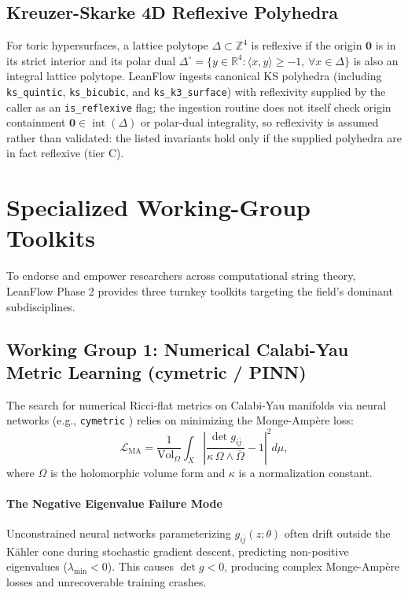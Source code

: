 \documentclass[11pt,a4paper]{article}
\begin{document}
\subsection{Kreuzer-Skarke 4D Reflexive Polyhedra}
For toric hypersurfaces, a lattice polytope $\Delta \subset \mathbb{Z}^4$ is reflexive if the origin $\mathbf{0}$ is in its strict interior and its polar dual $\Delta^\circ = \{ y \in \mathbb{R}^4 : \langle x, y \rangle \ge -1, \, \forall x \in \Delta \}$ is also an integral lattice polytope. LeanFlow ingests canonical KS polyhedra (including \texttt{ks\_quintic}, \texttt{ks\_bicubic}, and \texttt{ks\_k3\_surface}) with reflexivity supplied by the caller as an \texttt{is\_reflexive} flag; the ingestion routine does not itself check origin containment $\mathbf{0} \in \operatorname{int}(\Delta)$ or polar-dual integrality, so reflexivity is assumed rather than validated: the listed invariants hold only if the supplied polyhedra are in fact reflexive (tier C).

\section{Specialized Working-Group Toolkits}
\label{sec:working_groups}

To endorse and empower researchers across computational string theory, LeanFlow Phase 2 provides three turnkey toolkits targeting the field's dominant subdisciplines.

\subsection{Working Group 1: Numerical Calabi-Yau Metric Learning (cymetric / PINN)}
The search for numerical Ricci-flat metrics on Calabi-Yau manifolds via neural networks (e.g., \texttt{cymetric} \cite{anderson2021cymetric}) relies on minimizing the Monge-Ampère loss:
\begin{equation}
\mathcal{L}_{\text{MA}} = \frac{1}{\text{Vol}_\Omega} \int_X \left| \frac{\det g_{i\bar{j}}}{\kappa \, \Omega \wedge \bar{\Omega}} - 1 \right|^2 d\mu,
\end{equation}
where $\Omega$ is the holomorphic volume form and $\kappa$ is a normalization constant.

\paragraph{The Negative Eigenvalue Failure Mode}
Unconstrained neural networks parameterizing $g_{i\bar{j}}(z; \theta)$ often drift outside the Kähler cone during stochastic gradient descent, predicting non-positive eigenvalues ($\lambda_{\min} < 0$). This causes $\det g < 0$, producing complex Monge-Ampère losses and unrecoverable training crashes.
\end{document}
